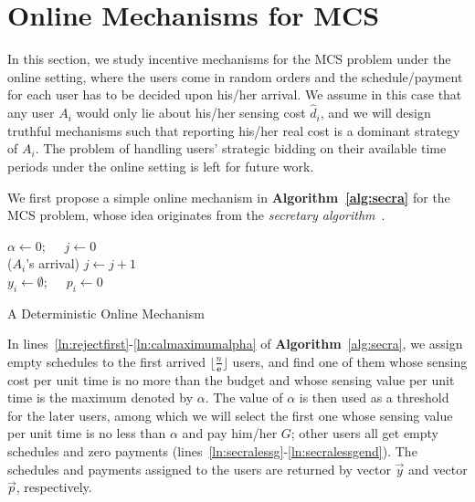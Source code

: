 \documentclass[10pt,journal,compsoc]{IEEEtran}
\begin{document}
\section{Online Mechanisms for MCS} \label{sec:online}
In this section, we study incentive mechanisms for the MCS problem under the online setting, where the users come in random orders and the schedule/payment for each user has to be decided upon his/her arrival.
We assume in this case that any user $A_i$ would only lie about his/her sensing cost $\hat{d}_i$, and we will design truthful mechanisms such that reporting his/her real cost is a dominant strategy of $A_i$.
The problem of handling users' strategic bidding on their available time periods under the online setting is left for future work.


  We first propose a simple online mechanism in \textbf{Algorithm~\ref{alg:secra}} for the MCS problem, whose idea originates from the \textit{secretary algorithm}~\cite{Dynkin1963}.
\begin{algorithm}[htb]
    $\alpha\leftarrow 0$;~~~$j\leftarrow 0$ \\
    \Upon($A_i$'s arrival){
$j\leftarrow j+1$\\
        {
            {
                $y_i\leftarrow \emptyset$;~~~$p_i\leftarrow 0$ \label{ln:secralessgend}
            }
        }
    }
    \caption{A Deterministic Online Mechanism} \label{alg:secra}
  \end{algorithm}
In lines~\ref{ln:rejectfirst}-\ref{ln:calmaximumalpha} of \textbf{Algorithm}~\ref{alg:secra}, we assign empty schedules to the first arrived $\lfloor \frac{n}{\mathbf{e}}\rfloor$ users, and find one of them whose sensing cost per unit time is no more than the budget and whose sensing value per unit time is the maximum denoted by $\alpha$. The value of $\alpha$ is then used as a threshold for the later users, among which we will select the first one whose sensing value per unit time is no less than $\alpha$ and pay him/her $G$; other users all get empty schedules and zero payments (lines~\ref{ln:secralessg}-\ref{ln:secralessgend}). The schedules and payments assigned to the users are returned by vector $\vec{y}$ and vector $\vec{p}$, respectively.
\end{document}
